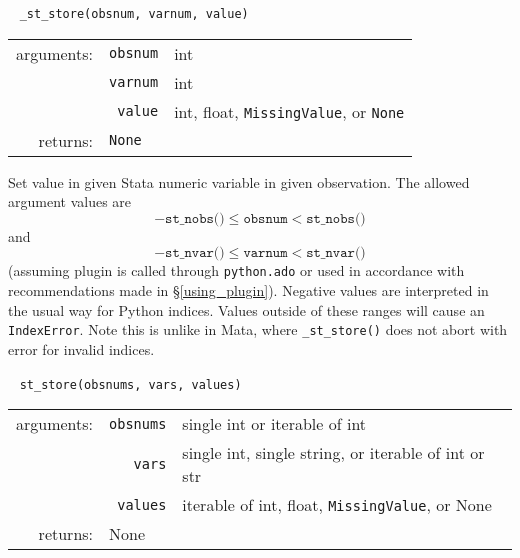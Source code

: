 \documentclass{article}
\begin{document}
			
			\ \newline
			\noindent \lstinline$_st_store(obsnum, varnum, value)$
								
			\vspace{1.5mm}
			\noindent 
			\indent \begin{tabular}{rrl}
					arguments: & \texttt{obsnum} & int \\
						& \texttt{varnum} & int \\
						& \texttt{value} & int, float, \lstinline$MissingValue$, or \texttt{None} \\
					returns: & \multicolumn{2}{l}{\texttt{None}}
				\end{tabular}
								
			\vspace{1.5mm}
			\noindent Set value in given Stata numeric variable in given observation. The allowed argument values are 
			\[
				-\texttt{st\_nobs()} \leq \texttt{obsnum} < \texttt{st\_nobs()}
			\]
			and
			\[
				-\texttt{st\_nvar()} \leq \texttt{varnum} < \texttt{st\_nvar()}
			\]
			(assuming plugin is called through \lstinline$python.ado$ or used in accordance with recommendations made in \S\ref{using_plugin}). Negative values are interpreted in the usual way for Python indices. Values outside of these ranges will cause an \lstinline$IndexError$. Note this is unlike in Mata, where \lstinline{_st_store()} does not abort with error for invalid indices. \newline
			
			
			\ \newline
			\noindent \lstinline$st_store(obsnums, vars, values)$
								
			\vspace{1.5mm}
			\noindent 
			\indent \begin{tabular}{rrl}
					arguments: & \texttt{obsnums} & single int or iterable of int \\
						& \texttt{vars} & single int, single string, or iterable of int or str \\
						& \texttt{values} & iterable of int, float, \lstinline$MissingValue$, or None \\
					returns: & \multicolumn{2}{l}{None}
				\end{tabular}
								
\end{document}

